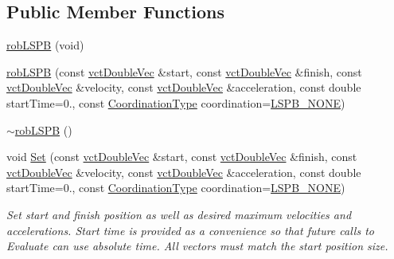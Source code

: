 \subsection*{Public Member Functions}
\begin{DoxyCompactItemize}
\item 
\hyperlink{classrob_l_s_p_b_af557abd92b0935434910d109c4759346}{rob\-L\-S\-P\-B} (void)
\item 
\hyperlink{classrob_l_s_p_b_a88699cc3a389605cda786f3e6ffb3c85}{rob\-L\-S\-P\-B} (const \hyperlink{vct_dynamic_vector_types_8h_ade4b3068c86fb88f41af2e5187e491c2}{vct\-Double\-Vec} \&start, const \hyperlink{vct_dynamic_vector_types_8h_ade4b3068c86fb88f41af2e5187e491c2}{vct\-Double\-Vec} \&finish, const \hyperlink{vct_dynamic_vector_types_8h_ade4b3068c86fb88f41af2e5187e491c2}{vct\-Double\-Vec} \&velocity, const \hyperlink{vct_dynamic_vector_types_8h_ade4b3068c86fb88f41af2e5187e491c2}{vct\-Double\-Vec} \&acceleration, const double start\-Time=0., const \hyperlink{classrob_l_s_p_b_a8feec61f7c94670dbdbe75e63dec8496}{Coordination\-Type} coordination=\hyperlink{classrob_l_s_p_b_a8feec61f7c94670dbdbe75e63dec8496a6183520633c3003062fc1a7c013ced4b}{L\-S\-P\-B\-\_\-\-N\-O\-N\-E})
\item 
\hyperlink{classrob_l_s_p_b_a9aeb4c86ed81fb50c883379e45fe8c88}{$\sim$rob\-L\-S\-P\-B} ()
\item 
void \hyperlink{classrob_l_s_p_b_afa07374ad33ea00cf5f4b2ec3d90321a}{Set} (const \hyperlink{vct_dynamic_vector_types_8h_ade4b3068c86fb88f41af2e5187e491c2}{vct\-Double\-Vec} \&start, const \hyperlink{vct_dynamic_vector_types_8h_ade4b3068c86fb88f41af2e5187e491c2}{vct\-Double\-Vec} \&finish, const \hyperlink{vct_dynamic_vector_types_8h_ade4b3068c86fb88f41af2e5187e491c2}{vct\-Double\-Vec} \&velocity, const \hyperlink{vct_dynamic_vector_types_8h_ade4b3068c86fb88f41af2e5187e491c2}{vct\-Double\-Vec} \&acceleration, const double start\-Time=0., const \hyperlink{classrob_l_s_p_b_a8feec61f7c94670dbdbe75e63dec8496}{Coordination\-Type} coordination=\hyperlink{classrob_l_s_p_b_a8feec61f7c94670dbdbe75e63dec8496a6183520633c3003062fc1a7c013ced4b}{L\-S\-P\-B\-\_\-\-N\-O\-N\-E})
\begin{DoxyCompactList}\small\item\em Set start and finish position as well as desired maximum velocities and accelerations. Start time is provided as a convenience so that future calls to Evaluate can use absolute time. All vectors must match the start position size. \end{DoxyCompactList}\item 

\end{DoxyCompactItemize}
